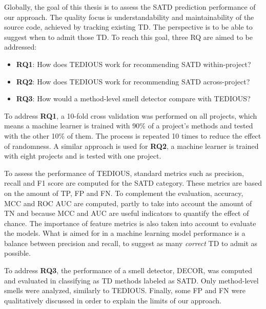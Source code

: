 Globally, the goal of this thesis is to assess the \ac{SATD} prediction performance of our approach. The quality focus is understandability and maintainability of the source code, achieved by tracking existing \ac{TD}. The perspective is to be able to suggest when to admit those \ac{TD}. To reach this goal, three \ac{RQ} are aimed to be addressed: 

\begin{itemize}
	\item \textbf{RQ1}: How does \ac{TEDIOUS} work for recommending \ac{SATD} within-project?
	\item \textbf{RQ2}: How does \ac{TEDIOUS} work for recommending \ac{SATD} across-project?
	\item \textbf{RQ3}: How would a method-level smell detector compare with \ac{TEDIOUS}?
\end{itemize}

To address \textbf{RQ1}, a 10-fold cross validation was performed on all projects, which means a machine learner is trained with 90\% of a project's methods and tested with the other 10\% of them. The process is repeated 10 times to reduce the effect of randomness. A similar approach is used for \textbf{RQ2}, a machine learner is trained with eight projects and is tested with one project. \par

To assess the performance of \ac{TEDIOUS}, standard metrics such as precision, recall and F1 score are computed for the \ac{SATD} category. These metrics are based on the amount of \ac{TP}, \ac{FP} and \ac{FN}. To complement the evaluation, accuracy, \ac{MCC} and \ac{ROC} \ac{AUC} are computed, partly to take into account the amount of \ac{TN} and because \ac{MCC} and \ac{AUC} are useful indicators to quantify the effect of chance. The importance of feature metrics is also taken into account to evaluate the models. What is aimed for in a machine learning model performance is a balance between precision and recall, to suggest as many \emph{correct} \ac{TD} to admit as possible. \par

To address \textbf{RQ3}, the performance of a smell detector, \ac{DECOR}, was computed and evaluated in classifying as \ac{TD} methods labeled as \ac{SATD}. Only method-level smells were analyzed, similarly to \ac{TEDIOUS}. Finally, some \ac{FP} and \ac{FN} were qualitatively discussed in order to explain the limits of our approach. \par

